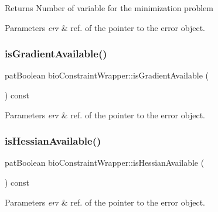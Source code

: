 \begin{DoxyReturn}{Returns}
Number of variable for the minimization problem 
\end{DoxyReturn}

\begin{DoxyParams}{Parameters}
{\em err} & ref. of the pointer to the error object. \\
\hline
\end{DoxyParams}
\mbox{\label{classbio_constraint_wrapper_a0596646c9d8aec807c6dee7a952d2a3f}} 
\subsubsection{\texorpdfstring{is\+Gradient\+Available()}{isGradientAvailable()}}
{\footnotesize\ttfamily pat\+Boolean bio\+Constraint\+Wrapper\+::is\+Gradient\+Available (\begin{DoxyParamCaption}{ }\end{DoxyParamCaption}) const}


\begin{DoxyParams}{Parameters}
{\em err} & ref. of the pointer to the error object. \\
\hline
\end{DoxyParams}
\mbox{\label{classbio_constraint_wrapper_a0fd19dd1f500465fbc243b60526bd76b}} 
\subsubsection{\texorpdfstring{is\+Hessian\+Available()}{isHessianAvailable()}}
{\footnotesize\ttfamily pat\+Boolean bio\+Constraint\+Wrapper\+::is\+Hessian\+Available (\begin{DoxyParamCaption}{ }\end{DoxyParamCaption}) const}


\begin{DoxyParams}{Parameters}
{\em err} & ref. of the pointer to the error object. \\
\hline
\end{DoxyParams}
\mbox{\label{classbio_constraint_wrapper_a6757a8f4928e8dbd8f26dfe1a4f53877}} 
